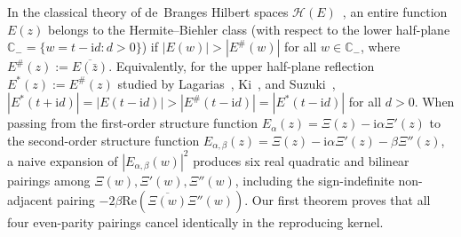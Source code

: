 \documentclass[11pt,reqno]{amsart}
\theoremstyle{definition}
\theoremstyle{remark}
\numberwithin{equation}{section}
\newcommand{\C}{\mathbb{C}}
\newcommand{\ii}{\mathrm{i}}
\newcommand{\Rea}{\mathrm{Re}}
\begin{document}
In the classical theory of de~Branges Hilbert spaces $\mathcal{H}(E)$~\cite{debranges1968,debranges1986}, an entire function $E(z)$ belongs to the Hermite--Biehler class (with respect to the lower half-plane $\C_- = \{w = t - \ii d : d > 0\}$) if $|E(w)| > |E^\#(w)|$ for all $w \in \C_-$, where $E^\#(z) := \overline{E(\bar{z})}$. Equivalently, for the upper half-plane reflection $E^*(z) := E^\#(z)$ studied by Lagarias~\cite{lagarias2006}, Ki~\cite{ki2008}, and Suzuki~\cite{suzuki2011}, $|E^*(t + \ii d)| = |E(t - \ii d)| > |E^\#(t - \ii d)| = |E^*(t - \ii d)|$ for all $d > 0$. When passing from the first-order structure function $E_\alpha(z) = \Xi(z) - \ii\alpha\Xi'(z)$ to the second-order structure function $E_{\alpha,\beta}(z) = \Xi(z) - \ii\alpha\Xi'(z) - \beta\Xi''(z)$, a naive expansion of $|E_{\alpha,\beta}(w)|^2$ produces six real quadratic and bilinear pairings among $\Xi(w), \Xi'(w), \Xi''(w)$, including the sign-indefinite non-adjacent pairing $-2\beta\Rea(\overline{\Xi(w)}\Xi''(w))$. Our first theorem proves that all four even-parity pairings cancel identically in the reproducing kernel.
\end{document}
